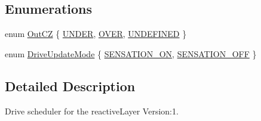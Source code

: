 \subsection*{Enumerations}
\begin{DoxyCompactItemize}
\item 
enum \hyperlink{group__allostaticController_gaf40887c05ba83b6f4c0809ce4716dcbc}{Out\+CZ} \{ \newline
\hyperlink{group__allostaticController_ggaf40887c05ba83b6f4c0809ce4716dcbcab5726a81978ba2a47fcea5ef4fb8fbf4}{U\+N\+D\+ER}, 
\newline
\hyperlink{group__allostaticController_ggaf40887c05ba83b6f4c0809ce4716dcbcaee4b1697462879d869ff122fc694e9e8}{O\+V\+ER}, 
\newline
\hyperlink{group__allostaticController_ggaf40887c05ba83b6f4c0809ce4716dcbca605159e8a4c32319fd69b5d151369d93}{U\+N\+D\+E\+F\+I\+N\+ED}
 \}
\item 
enum \hyperlink{group__allostaticController_gab2a3f165075ddd5df4b2f6910928a311}{Drive\+Update\+Mode} \{ \newline
\hyperlink{group__allostaticController_ggab2a3f165075ddd5df4b2f6910928a311a6b7e396bc942b13df719fee7bee389ef}{S\+E\+N\+S\+A\+T\+I\+O\+N\+\_\+\+ON}, 
\newline
\hyperlink{group__allostaticController_ggab2a3f165075ddd5df4b2f6910928a311ac4f1d0f383d94c415be67267485ad8ca}{S\+E\+N\+S\+A\+T\+I\+O\+N\+\_\+\+O\+FF}
 \}
\end{DoxyCompactItemize}


\subsection{Detailed Description}
Drive scheduler for the reactive\+Layer Version\+:1. 

